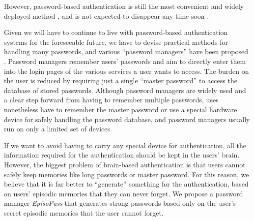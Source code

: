 \documentclass[runningheads,a4paper]{llncs}
\begin{document}

However, password-based authentication is still the most
convenient and widely deployed method \cite{Bonneau:ReplacePasswords},
and is not expected to disappear any time soon \cite{Herley:2009:PSS:1601990.1602010}.

Given we will have to continue to live with password-based authentication systems for the foreseeable future,
we have to devise practical methods for handling many passwords, and various ``password managers'' have been proposed
\cite{OnePassword,Dashlane,MilPass,LastPass,KeyPass,NortonIDSafe,IDManager}.
%
Password managers remember users' passwords and aim to directly enter them into the login pages of the various services a user wants to access.
%
The burden on the user is reduced by requiring just a single ``master password'' to access the database of stored passwords.
%
Although password managers are widely used and a clear step forward from having to remember multiple passwords, uses nonetheless have to remember the master password or use a special hardware device for safely handling the password database, and password managers usually run on only a limited set of devices.

%

If we want to avoid having to carry any special device for authentication,
all the information required for the authentication should be
kept in the users' brain.
%
However, the biggest problem of brain-based authentication is that
users cannot safely keep memories like long passwords or master password.
For this reason, we believe that
it is far better to ``generate'' something for the authentication,
based on users' episodic memories that they can never forget.
%
%
We propose a password manager \textit{EpisoPass} that generates strong passwords
based only on the user's secret episodic memories that the user cannot forget.
\end{document}
